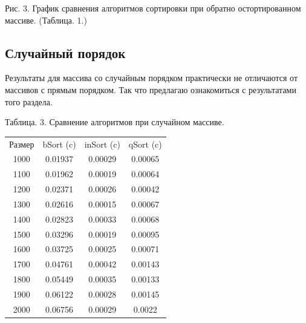 \documentclass[12pt]{report}
\begin{document}
\begin{center}
	\begin{center}
	\end{center}
	Рис. 3. График сравнения алгоритмов сортировки при обратно остортированном массиве. (Таблица. 1.)
\end{center}

\subsection{Случайный порядок}

Результаты для массива со случайным порядком практически не отличаются от массивов с прямым порядком.
Так что предлагаю ознакомиться с результатами того раздела.

\begin{center}
	Таблица. 3. Сравнение алгоритмов при случайном массиве.
	\begin{tabular}{|c c c c|}
		\hline
		Размер & bSort (c) & inSort (c) & qSort (c) \\ [0.5ex]
		1000 & 0.01937 & 0.00029 & 0.00065 \\ 
		\hline 
		1100 & 0.01962 & 0.00019 & 0.00064 \\ 
		\hline 
		1200 & 0.02371 & 0.00026 & 0.00042 \\ 
		\hline 
		1300 & 0.02616 & 0.00015 & 0.00067 \\ 
		\hline 
		1400 & 0.02823 & 0.00033 & 0.00068 \\ 
		\hline 
		1500 & 0.03296 & 0.00019 & 0.00095 \\ 
		\hline 
		1600 & 0.03725 & 0.00025 & 0.00071 \\ 
		\hline 
		1700 & 0.04761 & 0.00042 & 0.00143 \\ 
		\hline 
		1800 & 0.05449 & 0.00035 & 0.00133 \\ 
		\hline 
		1900 & 0.06122 & 0.00028 & 0.00145 \\ 
		\hline 
		2000 & 0.06756 & 0.00029 & 0.0022 \\ 
		\hline 
	\end{tabular}
\end{center}
\end{document}
